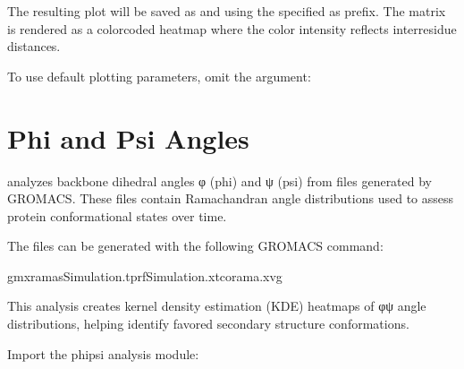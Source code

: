 \documentclass[a4paper,10pt,english]{sphinxmanual}
\begin{document}
\sphinxAtStartPar
The resulting plot will be saved as  and  using the specified  as prefix. The matrix is rendered as a color\sphinxhyphen{}coded heatmap where the color intensity reflects inter\sphinxhyphen{}residue distances.

\sphinxAtStartPar
To use default plotting parameters, omit the  argument:

\begin{sphinxVerbatim}[commandchars=\\\{\}]
 
\end{sphinxVerbatim}


\section{Phi and Psi Angles}
\label{\detokenize{Input:phi-and-psi-angles}}
\sphinxAtStartPar
{} analyzes backbone dihedral angles φ (phi) and ψ (psi) from  files generated by GROMACS. These files contain Ramachandran angle distributions used to assess protein conformational states over time.

\sphinxAtStartPar
The  files can be generated with the following GROMACS command:

\begin{sphinxVerbatim}[commandchars=\\\{\}]
gmxrama\PYGZhy{}sSimulation.tpr\PYGZhy{}fSimulation.xtc\PYGZhy{}orama.xvg
\end{sphinxVerbatim}

\sphinxAtStartPar
This analysis creates kernel density estimation (KDE) heatmaps of φ\sphinxhyphen{}ψ angle distributions, helping identify favored secondary structure conformations.

\sphinxAtStartPar
{}

\sphinxAtStartPar
Import the phi\sphinxhyphen{}psi analysis module:

\begin{sphinxVerbatim}[commandchars=\\\{\}]
 
\end{sphinxVerbatim}
\end{document}
